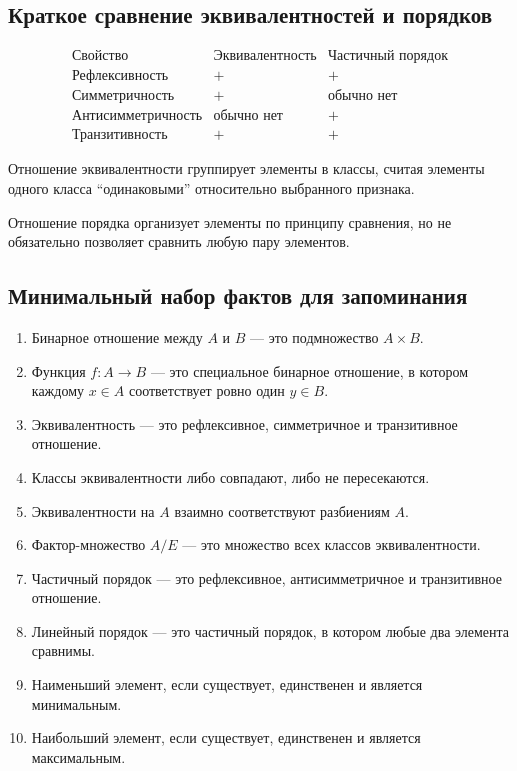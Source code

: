 \documentclass[12pt,a4paper]{article}
\begin{document}
\subsection{Краткое сравнение эквивалентностей и порядков}

\[
\begin{array}{c|c|c}
\text{Свойство} & \text{Эквивалентность} & \text{Частичный порядок}\\
\hline
\text{Рефлексивность} & + & +\\
\text{Симметричность} & + & \text{обычно нет}\\
\text{Антисимметричность} & \text{обычно нет} & +\\
\text{Транзитивность} & + & +
\end{array}
\]

Отношение эквивалентности группирует элементы в классы, считая элементы одного класса ``одинаковыми'' относительно выбранного признака.

Отношение порядка организует элементы по принципу сравнения, но не обязательно позволяет сравнить любую пару элементов.

\subsection{Минимальный набор фактов для запоминания}

\begin{enumerate}
\item Бинарное отношение между $A$ и $B$ --- это подмножество $A\times B$.
\item Функция $f:A\to B$ --- это специальное бинарное отношение, в котором каждому $x\in A$ соответствует ровно один $y\in B$.
\item Эквивалентность --- это рефлексивное, симметричное и транзитивное отношение.
\item Классы эквивалентности либо совпадают, либо не пересекаются.
\item Эквивалентности на $A$ взаимно соответствуют разбиениям $A$.
\item Фактор-множество $A/E$ --- это множество всех классов эквивалентности.
\item Частичный порядок --- это рефлексивное, антисимметричное и транзитивное отношение.
\item Линейный порядок --- это частичный порядок, в котором любые два элемента сравнимы.
\item Наименьший элемент, если существует, единственен и является минимальным.
\item Наибольший элемент, если существует, единственен и является максимальным.
\end{enumerate}
\end{document}
